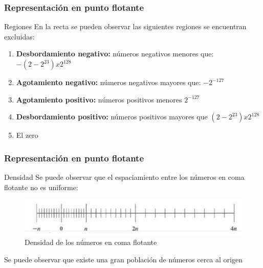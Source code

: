 \documentclass{beamer}
\begin{document}
\begin{frame}
	\frametitle{Representación en punto flotante}
	\begin{block}{Regiones}
	   En la recta se pueden observar las siguientes regiones se encuentran excluidas:
		\begin{enumerate}
			\item \textbf{Desbordamiento negativo:} números negativos menores que: $-(2 - 2^{23}) x 2^{128}$
			\item \textbf{Agotamiento negativo:} números negativos mayores que: $-2^{-127}$
			\item \textbf{Agotamiento positivo:} números positivos menores $2^{-127}$ 
			\item \textbf{Desbordamiento positivo:} números positivos mayores que $(2 - 2^{23}) x 2^{128}$ 
			\item El zero
		\end{enumerate}
	\end{block}
\end{frame}

\begin{frame}
	\frametitle{Representación en punto flotante}
	\begin{block}{Densidad}
	Se puede observar que el espaciamiento entre los números en coma flotante no es uniforme:	
	\begin{figure}[H]
		\centering
		\includegraphics[scale=0.3]{imagenes/densidad.png}
		\caption{Densidad de los números en coma flotante}
	\end{figure}
	Se puede observar que existe una gran población de números cerca al origen
	\end{block}
\end{frame}
\end{document}
